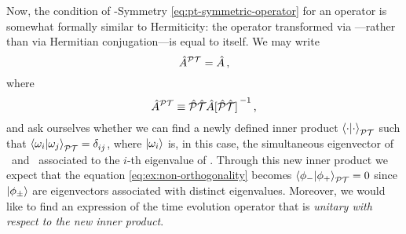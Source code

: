             Now, the condition of \PT-Symmetry \eqref{eq:pt-symmetric-operator} for an operator is somewhat formally similar to Hermiticity: the operator transformed via \hPT---rather than via Hermitian conjugation---is equal to itself. We may write
            \begin{equation*}
                \hat{A}^{\mathcal{P}\mathcal{T}} = \hat{A}
                \,\text{,}
            \end{equation*}
            where
            \begin{equation*}
                \hA^{\PT} \equiv \PTtransform{\hA}
                \mycomma
            \end{equation*}
            and ask ourselves whether we can find a newly defined inner product $\braket{\cdot}{\cdot}_{\mathcal{P}\mathcal{T}}$ such that $\braket{\omega_i}{\omega_j}_{\PT}= \tensor{\delta}{_i_j}$, where $\ket{\omega_i}$ is, in this case, the simultaneous eigenvector of \hA\ and \hPT\ associated to the $i$-th eigenvalue of \hA. Through this new inner product we expect that the equation \eqref{eq:ex:non-orthogonality} becomes $\braket{\phi_-}{\phi_+}_{\mathcal{P}\mathcal{T}} = 0$ since $\ket{\phi_\pm}$ are eigenvectors associated with distinct eigenvalues. Moreover, we would like to find an expression of the time evolution operator that is \emph{unitary with respect to the new inner product}.

